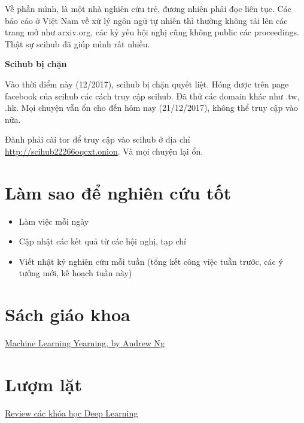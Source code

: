 Về phần mình, là một nhà nghiên cứu trẻ, đương nhiên phải đọc liên tục. Các báo cáo ở Việt Nam về xử lý ngôn ngữ tự nhiên thì thường không tải lên các trang mở như arxiv.org, các kỷ yếu hội nghị cũng không public các proceedings. Thật sự scihub đã giúp mình rất nhiều.

\textbf{Scihub bị chặn}

Vào thời điểm này (12/2017), scihub bị chặn quyết liệt. Hóng được trên page facebook của scihub các cách truy cập scihub. Đã thử các domain khác như .tw, .hk. Mọi chuyện vẫn ổn cho đến hôm nay (21/12/2017), không thể truy cập vào nữa.

Đành phải cài tor để truy cập vào scihub ở địa chỉ \href{http://scihub22266oqcxt.onion/https://dl.acm.org/citation.cfm?id=1852627}{http://scihub22266oqcxt.onion}. Và mọi chuyện lại ổn.

\section{Làm sao để nghiên cứu tốt}

\begin{itemize}
  \item Làm việc mỗi ngày
  \item Cập nhật các kết quả từ các hội nghị, tạp chí
  \item Viết nhật ký nghiên cứu mỗi tuần (tổng kết công việc tuần trước, các ý tưởng mới, kế hoạch tuần này)
\end{itemize}

\section{Sách giáo khoa}

\href{https://gallery.mailchimp.com/dc3a7ef4d750c0abfc19202a3/files/Machine_Learning_Yearning_V0.5_01.pdf}{Machine Learning Yearning, by Andrew Ng}

\section{Lượm lặt}

\href{https://www.kdnuggets.com/2017/10/3-popular-courses-deep-learning.html}{Review các khóa học Deep Learning}

